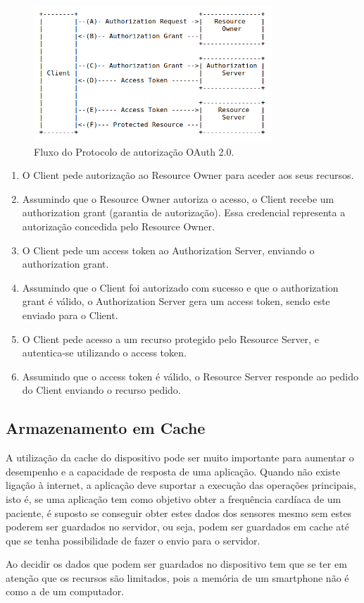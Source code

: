 \begin{figure}[H]
  \centering
  \includegraphics[width=0.8\textwidth]{imgs/oauth2flow.png}
  \caption[Fluxo do Protocolo 2.0]{Fluxo do Protocolo de autorização OAuth 2.0. \cite{oauth20}}
  \label{f:oauth2flow}
\end{figure}

\begin{enumerate}[label=(\Alph*)]
    \item O Client pede autorização ao Resource Owner para aceder aos seus recursos.
    \item Assumindo que o Resource Owner autoriza o acesso, o Client recebe um authorization grant (garantia de autorização). Essa credencial representa a autorização concedida pelo Resource Owner.
    \item O Client pede um access token ao Authorization Server, enviando o authorization grant.
    \item Assumindo que o Client foi autorizado com sucesso e que o authorization grant é válido, o Authorization Server gera um access token, sendo este enviado para o Client.
    \item O Client pede acesso a um recurso protegido pelo Resource Server, e autentica-se utilizando o access token.
    \item Assumindo que o access token é válido, o Resource Server responde ao pedido do Client enviando o recurso pedido.
\end{enumerate}

\subsection{Armazenamento em Cache}

A utilização da cache do dispositivo pode ser muito importante para aumentar o desempenho e a capacidade de resposta de uma aplicação. Quando não existe ligação à internet, a aplicação deve suportar a execução das operações principais, isto é, se uma aplicação tem como objetivo obter a frequência cardíaca de um paciente, é suposto se conseguir obter estes dados dos sensores mesmo sem estes poderem ser guardados no servidor, ou seja, podem ser guardados em cache até que se tenha possibilidade de fazer o envio para o servidor.
\par
Ao decidir os dados que podem ser guardados no dispositivo tem que se ter em atenção que os recursos são limitados, pois a memória de um smartphone não é como a de um computador.

